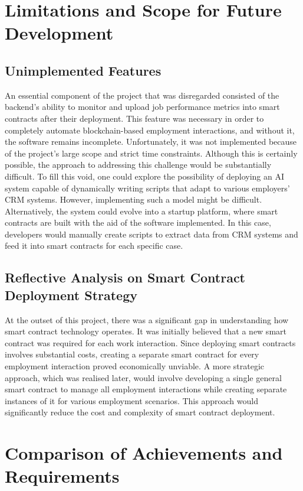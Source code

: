 \section{Limitations and Scope for Future Development}

\subsection{Unimplemented Features}

An essential component of the project that was disregarded consisted of the backend's ability to monitor and upload job performance metrics into smart contracts after their deployment. This feature was necessary in order to completely automate blockchain-based employment interactions, and without it, the software remains incomplete. Unfortunately, it was not implemented because of the project's large scope and strict time constraints. Although this is certainly possible, the approach to addressing this challenge would be substantially difficult. To fill this void, one could explore the possibility of deploying an AI system capable of dynamically writing scripts that adapt to various employers' CRM systems. However, implementing such a model might be difficult. Alternatively, the system could evolve into a startup platform, where smart contracts are built with the aid of the software implemented. In this case, developers would manually create scripts to extract data from CRM systems and feed it into smart contracts for each specific case.  

\subsection{Reflective Analysis on Smart Contract Deployment Strategy}

At the outset of this project, there was a significant gap in understanding how smart contract technology operates. It was initially believed that a new smart contract was required for each work interaction. Since deploying smart contracts involves substantial costs, creating a separate smart contract for every employment interaction proved economically unviable. A more strategic approach, which was realised later, would involve developing a single general smart contract to manage all employment interactions while creating separate instances of it for various employment scenarios. This approach would significantly reduce the cost and complexity of smart contract deployment.

\section{Comparison of Achievements and Requirements}


